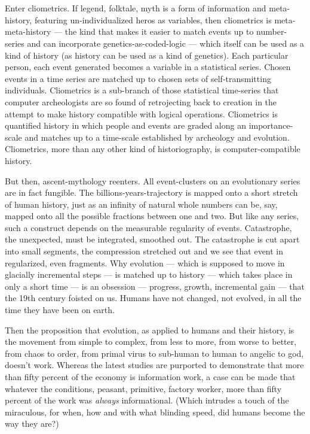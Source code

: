 \chapter{}

Enter cliometrics. If legend, folktale, myth
is a form of information and meta-history,
featuring un-individualized heros as variables, then cliometrics is meta-meta-history --- 
the kind that makes it easier to match events
up to number-series and can incorporate
genetics-as-coded-logic --- which itself can
be used as a kind of history (as history can be
used as a kind of genetics). Each particular
person, each event generated becomes a variable in a statistical series. Chosen events in
a time series are matched up to chosen sets of
self-transmitting individuals. Cliometrics is
a sub-branch of those statistical time-series
that computer archeologists are so found of
retrojecting back to creation in the attempt to
make history compatible with logical operations. Cliometrics is quantified history in
which people and events are graded along
an importance-scale and matches up to a
time-scale established by archeology and
evolution. Cliometrics, more than any other
kind of historiography, is computer-compatible history.

But then, ascent-mythology reenters. All
event-clusters on an evolutionary series are
in fact fungible. The billions-years-trajectory
is mapped onto a short stretch of human
history, just as an infinity of natural whole
numbers can be, say, mapped onto all the
possible fractions between one and two. But
like any series, such a construct depends on
the measurable regularity of events. Catastrophe, the unexpected, must be integrated,
smoothed out. The catastrophe is cut apart into small segments, the compression stretched
out and we see that event in regularized, even
fragments. Why evolution --- which is supposed to move in glacially incremental
steps --- is matched up to history --- which
takes place in only a short time --- is an
obsession --- progress, growth, incremental
gain --- that the 19th century foisted on us.
Humans have not changed, not evolved, in
all the time they have been on earth.

Then the proposition that evolution, as
applied to humans and their history, is the
movement from simple to complex, from
less to more, from worse to better, from chaos
to order, from primal virus to sub-human to
human to angelic to god, doesn't work.
Whereas the latest studies are purported to
demonstrate that more than fifty percent of
the economy is information work, a case can
be made that whatever the conditions, peasant, primitive,
factory worker, more than
fifty percent of the work was \emph{always} informational. (Which intrudes a touch of the
miraculous, for when, how and with what
blinding speed, did humans become the way
they are?)

